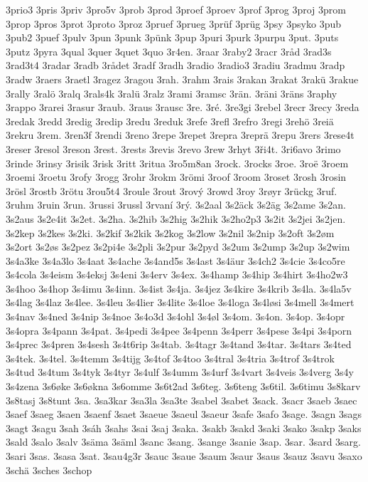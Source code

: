 3prio3
3pris
3priv
3pro5v
3prob
3prod
3proef
3proev
3prof
3prog
3proj
3prom
3prop
3pros
3prot
3proto
3proz
3pruef
3prueg
3prüf
3prüg
3psy
3psyko
3pub
3pub2
3puef
3pulv
3pun
3punk
3pünk
3pup
3puri
3purk
3purpu
3put.
3puts
3putz
3pyra
3qual
3quer
3quet
3quo
3r4en.
3raar
3raby2
3racr
3råd
3rad3s
3rad3t4
3radar
3radb
3rådet
3radf
3radh
3radio
3radio3
3radiu
3radmu
3radp
3radw
3raers
3raetl
3ragez
3ragou
3rah.
3rahm
3rais
3rakan
3rakat
3rakü
3rakue
3rally
3ralö
3ralq
3rals4k
3ralü
3ralz
3rami
3ramsc
3rän.
3räni
3räns
3raphy
3rappo
3rarei
3rasur
3raub.
3raus
3rausc
3re.
3ré.
3re3gi
3rebel
3recr
3recy
3reda
3redak
3redd
3redig
3redip
3redu
3reduk
3refe
3refl
3refro
3regi
3rehö
3reiä
3rekru
3rem.
3ren3f
3rendi
3reno
3repe
3repet
3repra
3reprä
3repu
3rers
3rese4t
3reser
3resol
3reson
3rest.
3rests
3revis
3revo
3rew
3rhyt
3ři4t.
3ri6avo
3rimo
3rinde
3rinsy
3risik
3risk
3ritt
3ritua
3ro5m8an
3rock.
3rocks
3roe.
3roë
3roem
3roemi
3roetu
3rofy
3rogg
3rohr
3rokm
3römi
3roof
3room
3roset
3rosh
3rosin
3rösl
3rostb
3rötu
3rou5t4
3roule
3rout
3rový
3rowd
3roy
3røyr
3rückg
3ruf.
3ruhm
3ruin
3run.
3russi
3russl
3rvaní
3rý.
3s2aal
3s2äck
3s2äg
3s2ame
3s2an.
3s2aus
3s2e4it
3s2et.
3s2ha.
3s2hib
3s2hig
3s2hik
3s2ho2p3
3s2it
3s2jei
3s2jen.
3s2kep
3s2kes
3s2ki.
3s2kif
3s2kik
3s2kog
3s2low
3s2nil
3s2nip
3s2oft
3s2øm
3s2ort
3s2øs
3s2pez
3s2pi4e
3s2pli
3s2pur
3s2pyd
3s2um
3s2ump
3s2up
3s2wim
3s4a3ke
3s4a3lo
3s4aat
3s4ache
3s4and5s
3s4ast
3s4äur
3s4ch2
3s4cie
3s4co5re
3s4cola
3s4eism
3s4eksj
3s4eni
3s4erv
3s4ex.
3s4hamp
3s4hip
3s4hirt
3s4ho2w3
3s4hoo
3s4hop
3s4imu
3s4inn.
3s4ist
3s4ja.
3s4jez
3s4kire
3s4krib
3s4la.
3s4la5v
3s4lag
3s4laz
3s4lee.
3s4leu
3s4lier
3s4lite
3s4loe
3s4loga
3s4løsi
3s4mell
3s4mert
3s4nav
3s4ned
3s4nip
3s4noe
3s4o3d
3s4ohl
3s4øl
3s4om.
3s4on.
3s4op.
3s4opr
3s4opra
3s4pann
3s4pat.
3s4pedi
3s4pee
3s4penn
3s4perr
3s4pese
3s4pi
3s4porn
3s4prec
3s4pren
3s4sesh
3s4t6rip
3s4tab.
3s4tagr
3s4tand
3s4tar.
3s4tars
3s4ted
3s4tek.
3s4tel.
3s4temm
3s4tijg
3s4tof
3s4too
3s4tral
3s4tria
3s4trof
3s4trok
3s4tud
3s4tum
3s4tyk
3s4tyr
3s4ulf
3s4umm
3s4urf
3s4vart
3s4veis
3s4verg
3s4y
3s4zena
3s6øke
3s6økna
3s6omme
3s6t2ad
3s6teg.
3s6teng
3s6til.
3s6timu
3s8karv
3s8tasj
3s8tunt
3sa.
3sa3kar
3sa3la
3sa3te
3sabel
3sabet
3sack.
3sacr
3saeb
3saec
3saef
3saeg
3saen
3saenf
3saet
3saeue
3saeul
3saeur
3safe
3safo
3sage.
3sagn
3sags
3sagt
3sagu
3sah
3sáh
3sahs
3sai
3saj
3saka.
3sakb
3sakd
3saki
3sako
3sakp
3saks
3sald
3salo
3salv
3säma
3säml
3sanc
3sang.
3sange
3sanie
3sap.
3sar.
3sard
3sarg.
3sari
3sas.
3sasa
3sat.
3sau4g3r
3sauc
3saue
3saum
3saur
3saus
3sauz
3savu
3saxo
3schä
3sches
3schop
